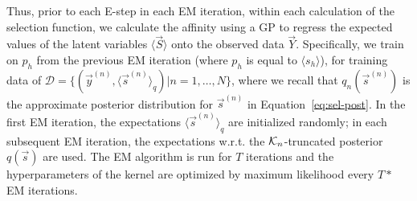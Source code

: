 Thus, prior to each E-step in each EM iteration, within each calculation of the selection function, we calculate the affinity  using a GP to regress the expected values of the latent variables $\langle \vec{S} \rangle$ onto the observed data $\vec{Y}$.  
Specifically, we train on $p_h$ from the previous EM iteration (where $p_h$ is equal to $\langle s_h \rangle$), for 
training data of 
$\mathcal{D} = \{ (\vec{y}^{(n)}, \langle\vec{s}^{(n)}\rangle_{q}) | n = 1,\dots, N \}$, 
where we recall that $q_{n}(\vec{s}^{(n)})$ is the approximate posterior distribution for $\vec{s}^{(n)}$ in Equation~\eqref{eq:sel-post}.
%
In the first EM iteration, the expectations $\langle\vec{s}^{(n)}\rangle_{q}$ are initialized randomly;
in each subsequent EM iteration, the %
expectations w.r.t. the $\mathcal{K}_{n}$-truncated posterior $q(\vec{s})$ are used. 
The EM algorithm is run for $T$ iterations and the hyperparameters of the kernel are optimized by maximum likelihood every $T\ast$ EM iterations.

